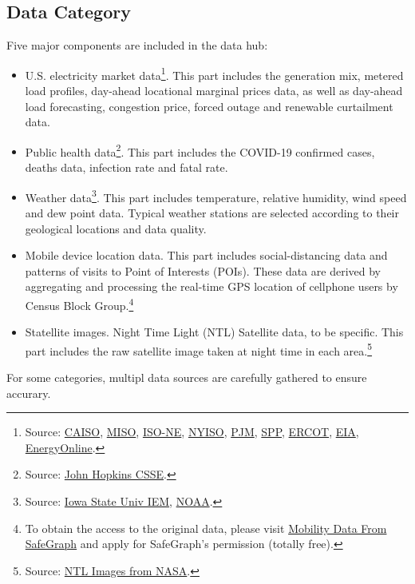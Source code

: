 \documentclass[11pt]{article}
\numberwithin{equation}{section}
\numberwithin{table}{section}
\numberwithin{figure}{section}
\begin{document}
\subsection{Data Category}
Five major components are included in the data hub: 
\begin{itemize}
	\item U.S. electricity market data\footnote{Source: \href{http://oasis.caiso.com/mrioasis/logon.do}{CAISO}, \href{https://www.misoenergy.org/markets-and-operations/real-time--market-data/market-reports/}{MISO}, \href{https://www.iso-ne.com/markets-operations/iso-express}{ISO-NE}, \href{https://www.nyiso.com/energy-market-operational-data}{NYISO}, \href{https://dataminer2.pjm.com/list}{PJM}, \href{https://marketplace.spp.org/groups/operational_data}{SPP}, \href{http://www.ercot.com/}{ERCOT}, \href{https://www.eia.gov/beta/electricity/gridmonitor/dashboard/electric_overview/US48/US48}{EIA}, \href{http://www.energyonline.com/}{EnergyOnline}.}. This part includes the generation mix, metered load profiles, day-ahead locational marginal prices data, as well as day-ahead load forecasting, congestion price, forced outage and renewable curtailment data.
	\item Public health data\footnote{Source: \href{https://github.com/CSSEGISandData/COVID-19}{John Hopkins CSSE}.}. This part includes the COVID-19 confirmed cases, deaths data, infection rate and fatal rate.
	\item Weather data\footnote{Source: \href{https://mesonet.agron.iastate.edu/request/download.phtml}{Iowa State Univ IEM}, \href{https://www.nws.noaa.gov/ost/asostech.html}{NOAA}.}. This part includes temperature, relative humidity, wind speed and dew point data. Typical weather stations are selected according to their geological locations and data quality.
	\item Mobile device location data. This part includes social-distancing data and patterns of visits to Point of Interests (POIs). These data are derived by aggregating and processing the real-time GPS location of cellphone users by Census Block Group.\footnote{To obtain the access to the original data, please visit \href{https://docs.safegraph.com/docs}{Mobility Data From SafeGraph} and apply for SafeGraph's permission (totally free).}
	\item Statellite images. Night Time Light (NTL)	Satellite data, to be specific. This part includes the raw satellite image taken at night time in each area.\footnote{Source: \href{https://ladsweb.modaps.eosdis.nasa.gov/missions-and-measurements/products/VNP46A1/}{NTL Images from NASA}.}
\end{itemize}
For some categories, multipl data sources are carefully gathered to ensure accurary.
\end{document}
